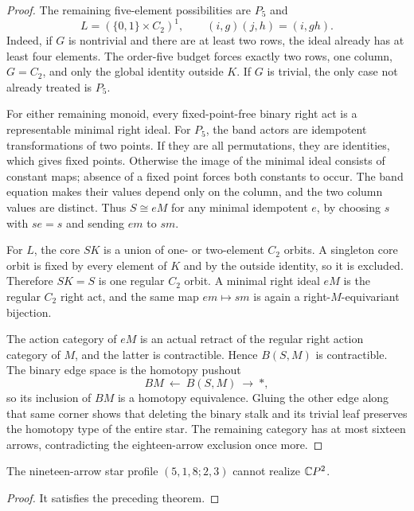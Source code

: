 \begin{proof}
The remaining five-element possibilities are $P_5$ and
\[
 L=(\{0,1\}\times C_2)^1,
 \qquad (i,g)(j,h)=(i,gh).
\]
Indeed, if $G$ is nontrivial and there are at least two rows,
the ideal already has at least four elements. The order-five
budget forces exactly two rows, one column, $G=C_2$, and only
the global identity outside $K$. If $G$ is trivial, the only
case not already treated is $P_5$.

For either remaining monoid, every fixed-point-free binary
right act is a representable minimal right ideal. For $P_5$,
the band actors are idempotent transformations of two points.
If they are all permutations, they are identities, which gives
fixed points. Otherwise the image of the minimal ideal consists
of constant maps; absence of a fixed point forces both constants
to occur. The band equation makes their values depend only on
the column, and the two column values are distinct. Thus
$S\cong eM$ for any minimal idempotent $e$, by choosing $s$ with
$se=s$ and sending $em$ to $sm$.

For $L$, the core $SK$ is a union of one- or two-element
$C_2$ orbits. A singleton core orbit is fixed by every element
of $K$ and by the outside identity, so it is excluded.
Therefore $SK=S$ is one regular $C_2$ orbit. A minimal right
ideal $eM$ is the regular $C_2$ right act, and the same map
$em\mapsto sm$ is again a right-$M$-equivariant bijection.

The action category of $eM$ is an actual retract of the regular
right action category of $M$, and the latter is contractible.
Hence $B(S,M)$ is contractible. The binary edge space is the
homotopy pushout
\[
 BM\ \longleftarrow\ B(S,M)\ \longrightarrow\ *,
\]
so its inclusion of $BM$ is a homotopy equivalence. Gluing the
other edge along that same corner shows that deleting the
binary stalk and its trivial leaf preserves the homotopy type
of the entire star. The remaining category has at most sixteen
arrows, contradicting the eighteen-arrow exclusion once more.
\end{proof}

\begin{corollary}
\label{CP2:A-star-five-one-eight-two-three}
The nineteen-arrow star profile $(5,1,8;2,3)$ cannot realize
$\mathbb{C}P^2$.
\end{corollary}
\begin{proof}
It satisfies the preceding theorem.
\end{proof}
